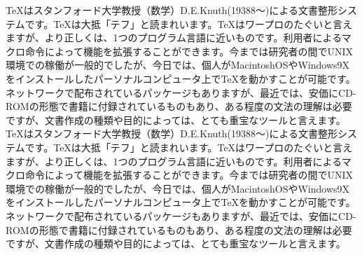 \documentclass[twocolumn,10pt]{jarticle}
\begin{document}
TeXはスタンフォード大学教授（数学）D.E.Knuth(19388～)による文書整形システムです。TeXは大抵「テフ」と読まれいます。TeXはワープロのたぐいと言えますが、より正しくは、1つのプログラム言語に近いものです。利用者によるマクロ命令によって機能を拡張することができます。今までは研究者の間でUNIX環境での稼働が一般的でしたが、今日では、個人がMacintoshOSやWindows9Xをインストールしたパーソナルコンピュータ上でTeXを動かすことが可能です。ネットワークで配布されているパッケージもありますが、最近では、安価にCD-ROMの形態で書籍に付録されているものもあり、ある程度の文法の理解は必要ですが、文書作成の種類や目的によっては、とても重宝なツールと言えます。
TeXはスタンフォード大学教授（数学）D.E.Knuth(19388～)による文書整形システムです。TeXは大抵「テフ」と読まれいます。TeXはワープロのたぐいと言えますが、より正しくは、1つのプログラム言語に近いものです。利用者によるマクロ命令によって機能を拡張することができます。今までは研究者の間でUNIX環境での稼働が一般的でしたが、今日では、個人がMacintoshOSやWindows9Xをインストールしたパーソナルコンピュータ上でTeXを動かすことが可能です。ネットワークで配布されているパッケージもありますが、最近では、安価にCD-ROMの形態で書籍に付録されているものもあり、ある程度の文法の理解は必要ですが、文書作成の種類や目的によっては、とても重宝なツールと言えます。
\end{document}
